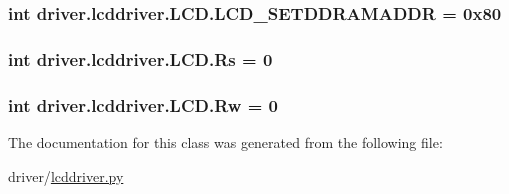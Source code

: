 \subsubsection[{L\+C\+D\+\_\+\+S\+E\+T\+D\+D\+R\+A\+M\+A\+D\+D\+R}]{\setlength{\rightskip}{0pt plus 5cm}int driver.\+lcddriver.\+L\+C\+D.\+L\+C\+D\+\_\+\+S\+E\+T\+D\+D\+R\+A\+M\+A\+D\+D\+R = 0x80\hspace{0.3cm}{\ttfamily [static]}}\label{classdriver_1_1lcddriver_1_1LCD_a919c560fc7039c4123fe071ca9b1a95e}
\hypertarget{classdriver_1_1lcddriver_1_1LCD_a99b7db0cf5e9abd67898c5b63df45036}{}
\subsubsection[{Rs}]{\setlength{\rightskip}{0pt plus 5cm}int driver.\+lcddriver.\+L\+C\+D.\+Rs = 0\hspace{0.3cm}{\ttfamily [static]}}\label{classdriver_1_1lcddriver_1_1LCD_a99b7db0cf5e9abd67898c5b63df45036}
\hypertarget{classdriver_1_1lcddriver_1_1LCD_acd0d0ce3f9b3aa9d0a0c71c4436035e5}{}
\subsubsection[{Rw}]{\setlength{\rightskip}{0pt plus 5cm}int driver.\+lcddriver.\+L\+C\+D.\+Rw = 0\hspace{0.3cm}{\ttfamily [static]}}\label{classdriver_1_1lcddriver_1_1LCD_acd0d0ce3f9b3aa9d0a0c71c4436035e5}


The documentation for this class was generated from the following file\+:\begin{DoxyCompactItemize}
\item 
driver/\hyperlink{driver_2lcddriver_8py}{lcddriver.\+py}\end{DoxyCompactItemize}
